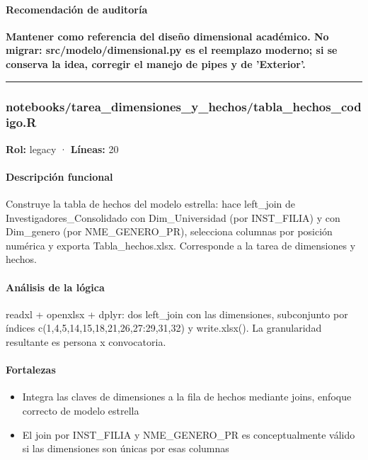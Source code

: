 \paragraph{Recomendación de auditoría}
\textbf{Mantener como referencia del diseño dimensional académico. No migrar: src/modelo/dimensional.py es el reemplazo moderno; si se conserva la idea, corregir el manejo de pipes y de 'Exterior'.}

\medskip
\hrule

\subsubsection{notebooks/tarea\_dimensiones\_y\_hechos/tabla\_hechos\_codigo.R}
\textbf{Rol:} legacy · \textbf{Líneas:} 20

\paragraph{Descripción funcional}
Construye la tabla de hechos del modelo estrella: hace left\_join de Investigadores\_Consolidado con Dim\_Universidad (por INST\_FILIA) y con Dim\_genero (por NME\_GENERO\_PR), selecciona columnas por posición numérica y exporta Tabla\_hechos.xlsx. Corresponde a la tarea de dimensiones y hechos.

\paragraph{Análisis de la lógica}
readxl + openxlsx + dplyr: dos left\_join con las dimensiones, subconjunto por índices c(1,4,5,14,15,18,21,26,27:29,31,32) y write.xlsx(). La granularidad resultante es persona x convocatoria.

\paragraph{Fortalezas}
\begin{itemize}
  \item Integra las claves de dimensiones a la fila de hechos mediante joins, enfoque correcto de modelo estrella
  \item El join por INST\_FILIA y NME\_GENERO\_PR es conceptualmente válido si las dimensiones son únicas por esas columnas
\end{itemize}

